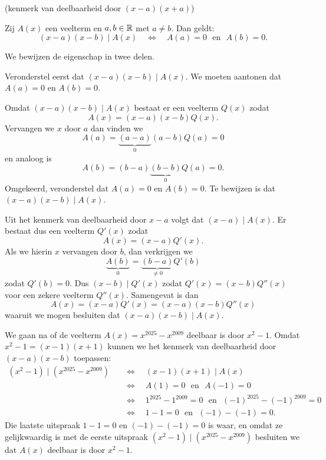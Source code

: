 \documentclass{ximera}
\begin{document}
\begin{theorem}(kenmerk van deelbaarheid door \((x-a)(x+a)\))

Zij $A(x)$ een veelterm en $a,b \in \mathbb{R}$ met $a \neq b$. Dan geldt:
\[
(x-a)(x-b) \mid A(x) \quad \Leftrightarrow \quad A(a) = 0 \,\, \text{ en } \,\, A(b) = 0.
\]

\end{theorem} 


We bewijzen de eigenschap in twee delen.

Veronderstel eerst dat $(x-a)(x-b) \mid A(x)$. We moeten aantonen dat $A(a) = 0$ en $A(b) = 0$.

Omdat $(x-a)(x-b) \mid A(x)$ bestaat er een veelterm $Q(x)$ zodat
\[
A(x) = (x-a)(x-b)Q(x).
\]
Vervangen we $x$ door $a$ dan vinden we 
\[
A(a) = \underbrace{(a-a)}_{0}(a-b)Q(a) = 0
\]
en analoog is
\[
A(b) = (b-a)\underbrace{(b-b)}_{0}Q(a) = 0.
\]
Omgekeerd, veronderstel dat $A(a) = 0$ en $A(b) = 0$. Te bewijzen is dat $(x-a)(x-b) \mid A(x)$.

Uit het kenmerk van deelbaarheid door $x-a$ volgt dat $(x-a) \mid A(x)$. Er bestaat dus een veelterm $Q'(x)$ zodat
\[
A(x) = (x-a)Q'(x).
\]
Als we hierin $x$ vervangen door $b$, dan verkrijgen we 
\[
\underbrace{A(b)}_{0} = \underbrace{(b - a)}_{\neq 0} Q'(b)
\]
zodat $Q'(b) = 0$. Dus $(x-b) \mid Q'(x)$ zodat $Q'(x) = (x-b)Q''(x)$ voor een zekere veelterm $Q''(x)$. Samengevat is dan
\[
A(x) = (x-a)Q'(x) = (x-a)(x-b)Q''(x)
\]
waaruit we mogen besluiten dat $(x-a)(x-b) \mid A(x)$.



\begin{example} 
We gaan na of de veelterm $A(x) = x^{2025} - x^{2009}$ deelbaar is door $x^2 - 1$. Omdat $x^2-1 = (x-1)(x+1)$ kunnen we het kenmerk van deelbaarheid door $(x-a)(x-b)$ toepassen:
\begin{align*}
(x^2-1) \mid (x^{2025} - x^{2009}) \quad 
& \Leftrightarrow \quad (x-1)(x+1) \mid A(x) \\
& \Leftrightarrow \quad A(1) = 0 \,\, \text{ en } \,\, A(-1) = 0 \\
& \Leftrightarrow \quad 1^{2025} - 1^{2009} = 0 \,\, \text{ en } \,\, (-1)^{2025} - (-1)^{2009} = 0 \\
& \Leftrightarrow \quad 1 - 1 = 0 \,\, \text{ en } \,\, (-1) - (-1) = 0.
\end{align*}
Die laatste uitspraak $1 - 1 = 0$ en $(-1) - (-1) = 0$ is waar, en omdat ze gelijkwaardig is met de eerste uitspraak $(x^2-1) \mid (x^{2025} - x^{2009})$ besluiten we dat $A(x)$ deelbaar is door $x^2-1$. 
\end{example} 

	
\end{document}
